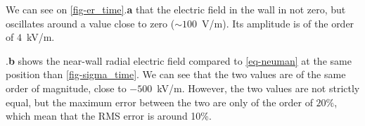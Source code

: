   We can see on \cref{fig-er_time}.{\bf a} that the electric field in the wall in not zero, but oscillates around a value close to zero ($\sim 100$~V/m).
  Its amplitude is of the order of $4$~kV/m.
  
  .{\bf b} shows the near-wall  radial electric field compared to \cref{eq-neuman} at the same position than \cref{fig-sigma_time}.
  We can see that the two values are of the same order of magnitude, close to $-500$~kV/m.
  However, the two values are not strictly equal, but the maximum error between the two are only of the order of $20\%$, which mean that the \ac{RMS} error is around 10\%.